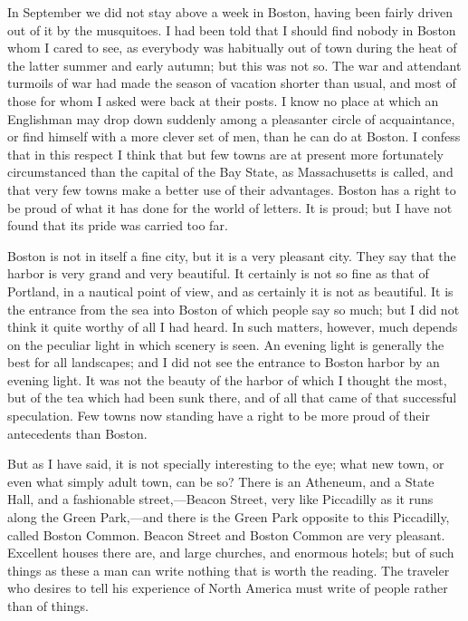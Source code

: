 In September we did not stay above a week in Boston, having been
fairly driven out of it by the musquitoes.  I had been told that I
should find nobody in Boston whom I cared to see, as everybody was
habitually out of town during the heat of the latter summer and
early autumn; but this was not so.  The war and attendant turmoils
of war had made the season of vacation shorter than usual, and most
of those for whom I asked were back at their posts.  I know no
place at which an Englishman may drop down suddenly among a
pleasanter circle of acquaintance, or find himself with a more
clever set of men, than he can do at Boston.  I confess that in
this respect I think that but few towns are at present more
fortunately circumstanced than the capital of the Bay State, as
Massachusetts is called, and that very few towns make a better use
of their advantages.  Boston has a right to be proud of what it has
done for the world of letters.  It is proud; but I have not found
that its pride was carried too far.

Boston is not in itself a fine city, but it is a very pleasant
city.  They say that the harbor is very grand and very beautiful.
It certainly is not so fine as that of Portland, in a nautical
point of view, and as certainly it is not as beautiful.  It is the
entrance from the sea into Boston of which people say so much; but
I did not think it quite worthy of all I had heard.  In such
matters, however, much depends on the peculiar light in which
scenery is seen.  An evening light is generally the best for all
landscapes; and I did not see the entrance to Boston harbor by an
evening light.  It was not the beauty of the harbor of which I
thought the most, but of the tea which had been sunk there, and of
all that came of that successful speculation.  Few towns now
standing have a right to be more proud of their antecedents than
Boston.

But as I have said, it is not specially interesting to the eye;
what new town, or even what simply adult town, can be so?  There is
an Atheneum, and a State Hall, and a fashionable street,---Beacon
Street, very like Piccadilly as it runs along the Green Park,---and
there is the Green Park opposite to this Piccadilly, called Boston
Common.  Beacon Street and Boston Common are very pleasant.
Excellent houses there are, and large churches, and enormous
hotels; but of such things as these a man can write nothing that is
worth the reading.  The traveler who desires to tell his experience
of North America must write of people rather than of things.

